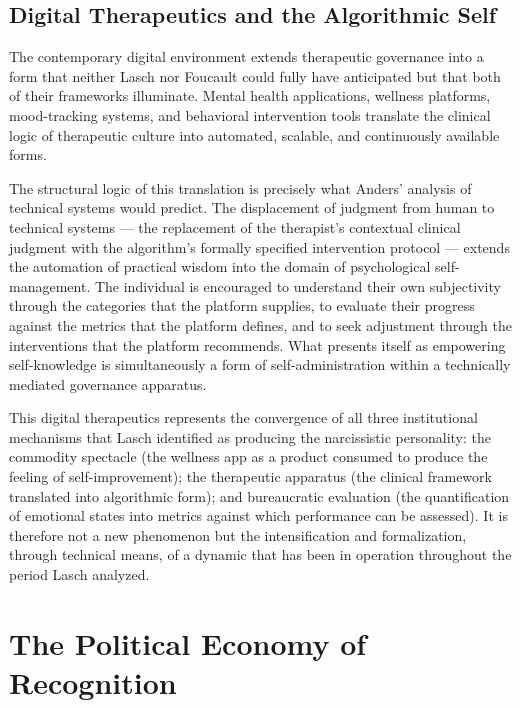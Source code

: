 \documentclass[12pt]{memoir}
\begin{document}
\subsection{Digital Therapeutics and the Algorithmic Self}

The contemporary digital environment extends therapeutic governance into a form that
neither Lasch nor Foucault could fully have anticipated but that both of their
frameworks illuminate. Mental health applications, wellness platforms, mood-tracking
systems, and behavioral intervention tools translate the clinical logic of therapeutic
culture into automated, scalable, and continuously available forms.

The structural logic of this translation is precisely what Anders' analysis of
technical systems would predict. The displacement of judgment from human to technical
systems — the replacement of the therapist's contextual clinical judgment with the
algorithm's formally specified intervention protocol — extends the automation of
practical wisdom into the domain of psychological self-management. The individual
is encouraged to understand their own subjectivity through the categories that the
platform supplies, to evaluate their progress against the metrics that the platform
defines, and to seek adjustment through the interventions that the platform recommends.
What presents itself as empowering self-knowledge is simultaneously a form of
self-administration within a technically mediated governance apparatus.

This digital therapeutics represents the convergence of all three institutional
mechanisms that Lasch identified as producing the narcissistic personality: the
commodity spectacle (the wellness app as a product consumed to produce the feeling
of self-improvement); the therapeutic apparatus (the clinical framework translated
into algorithmic form); and bureaucratic evaluation (the quantification of emotional
states into metrics against which performance can be assessed). It is therefore not
a new phenomenon but the intensification and formalization, through technical means,
of a dynamic that has been in operation throughout the period Lasch analyzed.

\section{The Political Economy of Recognition}
\label{sec:recognition}
\end{document}

